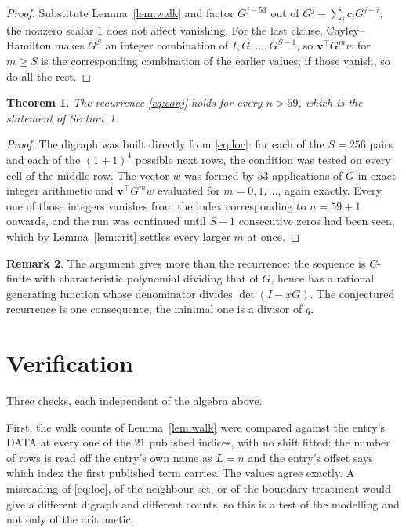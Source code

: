 \documentclass[11pt,a4paper]{article}
\theoremstyle{plain}
\newtheorem{theorem}{Theorem}
\theoremstyle{definition}
\newtheorem{remark}[theorem]{Remark}
\begin{document}
\begin{proof}
Substitute Lemma~\ref{lem:walk} and factor $G^{j-53}$ out of
$G^{j}-\sum_ic_iG^{j-i}$; the nonzero scalar $1$ does not affect
vanishing. For the last clause, Cayley--Hamilton makes $G^{S}$ an integer combination of
$I,G,\dots,G^{S-1}$, so $\mathbf{v}^{\!\top}G^{m}w$ for $m\ge S$ is the corresponding
combination of the earlier values; if those vanish, so do all the rest.
\end{proof}

\begin{theorem}
The recurrence \eqref{eq:conj} holds for every $n>59$, which is the statement of
Section~1.
\end{theorem}

\begin{proof}
The digraph was built directly from \eqref{eq:loc}: for each of the $S=256$ pairs and each
of the $(1+1)^{4}$ possible next rows, the condition was tested on every cell of
the middle row. The vector $w$ was formed by $53$ applications of $G$ in exact integer
arithmetic and $\mathbf{v}^{\!\top}G^{m}w$ evaluated for $m=0,1,\dots$, again exactly.
Every one of those integers vanishes from the index corresponding to $n=59+1$ onwards,
and the run was continued until $S+1$ consecutive zeros had been seen, which by
Lemma~\ref{lem:crit} settles every larger $m$ at once.
\end{proof}

\begin{remark}
The argument gives more than the recurrence: the sequence is $C$-finite with characteristic
polynomial dividing that of $G$, hence has a rational generating function whose denominator
divides $\det(I-xG)$. The conjectured recurrence is one consequence; the minimal one is a
divisor of $q$.
\end{remark}

\section{Verification}

Three checks, each independent of the algebra above.

First, the walk counts of Lemma~\ref{lem:walk} were compared against the entry's DATA at
every one of the $21$ published indices, with no shift fitted: the number of rows is
read off the entry's own name as $L=n$ and the entry's offset says which index the first
published term carries. The values agree exactly. A misreading of \eqref{eq:loc}, of the
neighbour set, or of the boundary treatment would give a different digraph and different
counts, so this is a test of the modelling and not only of the arithmetic.
\end{document}
